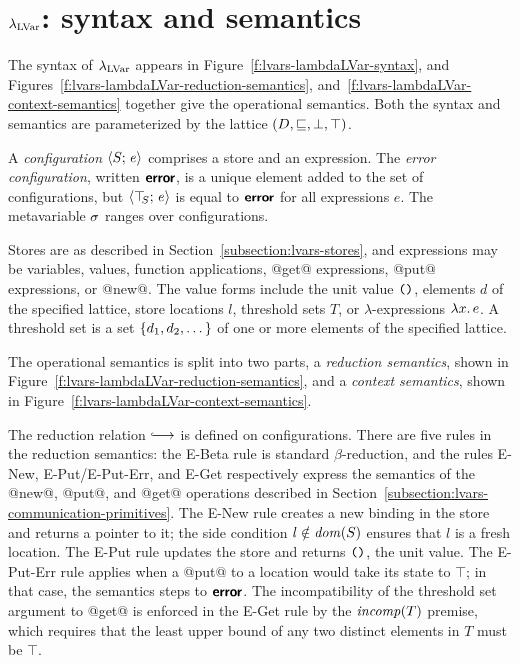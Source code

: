 \section{$\lambda_{\textrm{LVar}}$: syntax and semantics}\label{s:lvars-lambdalvar}

\FigLambdaLVarGrammar

\FigLambdaLVarReductionSemantics

\FigLambdaLVarContextSemantics

The syntax of $\lambda_{\textrm{LVar}}$ appears in
Figure~\ref{f:lvars-lambdaLVar-syntax}, and
Figures~\ref{f:lvars-lambdaLVar-reduction-semantics},
and~\ref{f:lvars-lambdaLVar-context-semantics} together give the
operational semantics.  Both the syntax and semantics are
parameterized by the lattice $(D, \sqsubseteq, \bot, \top)$.

A \emph{configuration} $\langle S;\, e \rangle$ comprises a store and an
expression.  The \emph{error configuration}, written $\textbf{\textsf{error}}$, is a
unique element added to the set of configurations, but
$\langle \top\hspace{-0.85mm}_{S};\, e \rangle$ is equal to $\textbf{\textsf{error}}$ for all expressions $e$.  The
metavariable $\sigma$ ranges over configurations.

Stores are as described in Section~\ref{subsection:lvars-stores}, and
expressions may be variables, values, function applications, @get@
expressions, @put@ expressions, or @new@.  The value forms include the
unit value $\mbox{\texttt{()}}$, elements $d$ of the specified lattice, store
locations $l$, threshold sets $T$, or $\lambda$-expressions
$\lambda x.\,e$.  A threshold set is a set $\left\{d_1, d_2, \dots\right\}$ of
one or more elements of the specified lattice.

The operational semantics is split into two parts, a \emph{reduction
  semantics}, shown in
Figure~\ref{f:lvars-lambdaLVar-reduction-semantics}, and a
\emph{context semantics}, shown in
Figure~\ref{f:lvars-lambdaLVar-context-semantics}.

The reduction relation $\parstepsto$ is defined on
configurations. There are five rules in the reduction semantics: the
{\sc E-Beta} rule is standard $\beta$-reduction, and the rules {\sc
  E-New}, {\sc E-Put}/{\sc E-Put-Err}, and {\sc E-Get} respectively
express the semantics of the @new@, @put@, and @get@ operations
described in Section~\ref{subsection:lvars-communication-primitives}.
The {\sc E-New} rule creates a new binding in the store and returns a
pointer to it; the side condition $l \notin \mathit{dom}(S)$ ensures that $l$
is a fresh location.  The {\sc E-Put} rule updates the store and
returns $\mbox{\texttt{()}}$, the unit value.  The {\sc E-Put-Err} rule applies
when a @put@ to a location would take its state to $\top$; in that
case, the semantics steps to $\textbf{\textsf{error}}$.  The incompatibility of the
threshold set argument to @get@ is enforced in the {\sc E-Get} rule by
the $\mathit{incomp}(T)$ premise, which requires that the least upper bound of
any two distinct elements in $T$ must be $\top$.

